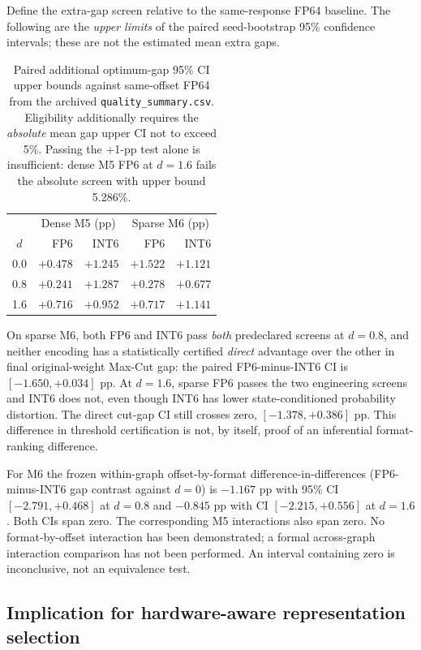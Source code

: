 Define the extra-gap screen relative to the same-response
FP64 baseline. The following are the \emph{upper limits}
of the paired seed-bootstrap 95\% confidence intervals;
these are not the estimated mean extra gaps.
\begin{table}[htbp]\centering\small
\begin{tabular}{@{}c rr rr@{}}\toprule
 & \multicolumn{2}{c}{Dense M5 (pp)}
 & \multicolumn{2}{c}{Sparse M6 (pp)}\\
$d$ & FP6 & INT6 & FP6 & INT6\\\midrule
0.0 & $+0.478$ & $+1.245$ & $+1.522$ & $+1.121$\\
0.8 & $+0.241$ & $+1.287$ & $+0.278$ & $+0.677$\\
1.6 & $+0.716$ & $+0.952$ & $+0.717$ & $+1.141$\\\bottomrule
\end{tabular}
\caption{Paired additional optimum-gap 95\% CI upper
bounds against same-offset FP64 from the archived
\texttt{quality\_summary.csv}. Eligibility additionally
requires the \emph{absolute} mean gap upper CI not
to exceed 5\%. Passing the +1-pp test alone is
insufficient: dense M5 FP6 at $d=1.6$ fails the
absolute screen with upper bound 5.286\%.}
\label{tab:heldout-extra-ci}
\end{table}

On sparse M6, both FP6 and INT6 pass \emph{both}
predeclared screens at $d=0.8$, and neither encoding
has a statistically certified \emph{direct} advantage
over the other in final original-weight Max-Cut gap:
the paired FP6-minus-INT6 CI is
$[-1.650,+0.034]$ pp. At $d=1.6$, sparse FP6 passes
the two engineering screens and INT6 does not, even
though INT6 has lower state-conditioned probability
distortion. The direct cut-gap CI still crosses zero,
$[-1.378,+0.386]$ pp. This difference in
threshold certification is not, by itself, proof of
an inferential format-ranking difference.

For M6 the frozen within-graph offset-by-format
difference-in-differences (FP6-minus-INT6 gap
contrast against $d=0$) is $-1.167$ pp with
95\% CI $[-2.791,+0.468]$ at $d=0.8$ and
$-0.845$ pp with CI $[-2.215,+0.556]$ at $d=1.6$.
Both CIs span zero. The corresponding M5 interactions
also span zero. No format-by-offset interaction has
been demonstrated; a formal across-graph interaction
comparison has not been performed. An interval
containing zero is inconclusive, not an equivalence test.

\subsection{Implication for hardware-aware representation selection}

